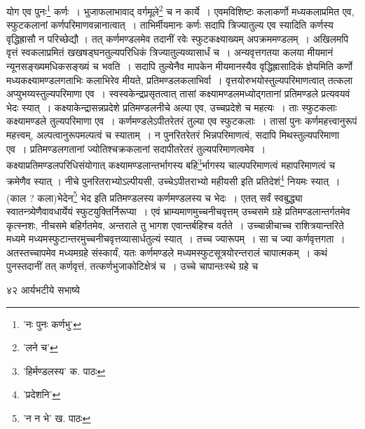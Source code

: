 \documentclass[11pt, openany]{book}
\begin{document}
{{{{{\vspace{0.3cm}
\noindent योग एव पुनः\renewcommand{\thefootnote}{१}\footnote{'नः पुनः कर्णभु'} कर्णः~। भुजाफलाभावाद् वर्गमूले\renewcommand{\thefootnote}{२}\footnote{'लने च'} च न कार्ये~। एवमविशिष्टः कलाकर्णो मध्यकलाप्रमित एव, स्फुटकलानां कर्णपरिमाणवन्नानात्वात्~। ताभिर्मीयमानः कर्णः सदापि त्रिज्यातुल्य एव स्यादिति कर्णस्य वृद्धिह्रासौ न परिच्छेद्यौ । तत् कर्णमण्डलमेव तदानीं रवेः स्फुटकक्ष्याख्यम् अपक्रममण्डलम्~। अखिलमपि वृत्तं स्वकलाप्रमितं खखषड्घनतुल्यपरिधिकं त्रिज्यातुल्यव्यासार्धं च~। अन्यवृत्तगतया कलया मीयमानं न्यूनसङ्ख्यमधिकसङ्ख्यं च भवति~। सदापि तुल्येनैव मापकेन मीयमानस्यैव वृद्धिह्रासादिकं ज्ञेयमिति कर्णो मध्यकक्ष्यामण्डलगताभिः कलाभिरेव मीयते, प्रतिमण्डलकलाभिर्वा~। वृत्तयोरुभयोस्तुल्यपरिमाणत्वात् तत्कला अप्युभय्यस्तुल्यपरिमाणा एव~। स्वस्वकेन्द्रप्रसृतत्वात् तासां कक्ष्यामण्डलमध्योद्गतानां प्रतिमण्डले प्रत्यवयवं भेदः स्यात्~। कक्ष्याकेन्द्रासन्नप्रदेशे प्रतिमण्डलनीचे अल्पा एव, उच्चप्रदेशे च महत्यः~। ताः स्फुटकलाः कक्ष्यामण्डले तुल्यपरिमाणा एव~। कर्णमण्डलेऽपीतरेतरं तुल्या एव स्फुटकलाः~। तासां पुनः कर्णमहत्त्वानुरूपं महत्त्वम्, अल्पत्वानुरूपमल्पत्वं च स्याताम्~। न पुनरितरेतरं भिन्नपरिमाणत्वं, सदापि मिथस्तुल्यपरिमाणा एव~। प्रतिमण्डलगतानां ज्योतिश्चक्रकलानां सदापीतरेतरं तुल्यपरिमाणत्वमेव~। कक्ष्याप्रतिमण्डलपरिधिसंयोगात् कक्ष्यामण्डलान्तर्भागस्य बहि\renewcommand{\thefootnote}{३}\footnote{'हिर्मण्डलस्य' क. पाठः}र्भागस्य चाल्पपरिमाणत्वं महापरिमाणत्वं च क्रमेणैव स्यात् । नीचे पुनरितराभ्योऽल्पीयसी, उच्चेऽपीतराभ्यो महीयसी इति प्रतिदेशं\renewcommand{\thefootnote}{४}\footnote{'प्रदेशनि'} नियमः स्यात्~। (काल ? कला)भेदेन\renewcommand{\thefootnote}{५}\footnote{'न न भे' ख. पाठः} भेद इति प्रतिमण्डलस्य कर्णमण्डलस्य च भेदः~। एतत् सर्वं स्वबुद्ध्या स्वातन्त्र्येणैवावधार्येयं स्फुटयुक्तिर्निरूप्या~। एवं भ्राम्यमाणमुच्चनीचवृत्तम् उच्चसमे ग्रहे प्रतिमण्डलान्तर्गतमेव कृत्स्नशः, नीचसमे बहिर्गतमेव, अन्तराले तु भागश एवान्तर्बहिश्च वर्तते~। उच्चान्नीचाच्च राशित्रयान्तरिते मध्यमे मध्यमस्फुटान्तरमुच्चनीचवृत्तव्यासार्धतुल्यं
स्यात्~। तच्च ज्यारूपम्~। सा च ज्या कर्णवृत्तगता~। अतस्तच्चापमेव मध्यमग्रहे संस्कार्यं, यतः कर्णमण्डले मध्यमस्फुटसूत्रयोरन्तरालं चापात्मकम्~। कथं पुनस्तदानीं तत् कर्णवृत्तं, तत्कर्णभुजाकोटिक्षेत्रं च~। उच्चे चापान्तःस्थे ग्रहे च

\newpage


\vspace{3cm} ४२\hspace{4cm} आर्यभटीये सभाष्ये 

}}}}}
\end{document}
